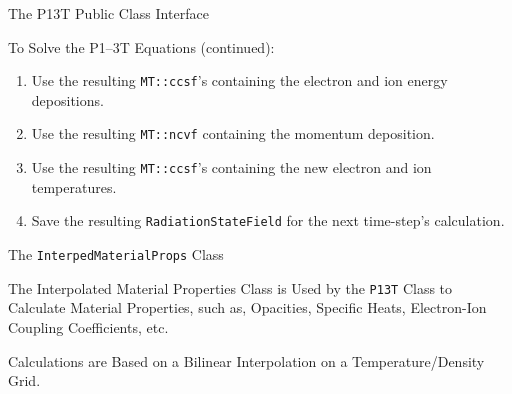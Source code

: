\documentclass{myslidehead}
\begin{document}

\begin{slide}

  \begin{center}
    \large The P13T Public Class Interface
  \end{center}

  To Solve the P1--3T Equations (continued):

  \begin{enumerate}
    \setcounter{enumi}{\value{myenumi}}
    \item Use the resulting \verb#MT::ccsf#'s containing the electron
      and ion energy depositions.
    \item Use the resulting \verb#MT::ncvf# containing the momentum
      deposition.
    \normalcolor
    \item Use the resulting \verb#MT::ccsf#'s containing the new electron
      and ion temperatures.
    \item Save the resulting \verb#RadiationStateField#
      for the next time-step's calculation.
    \setcounter{myenumi}{\value{enumi}}
  \end{enumerate}

\end{slide}


\begin{slide}

  \begin{center}
    \large The \verb#InterpedMaterialProps# Class
  \end{center}

  The Interpolated Material Properties Class is Used by the \verb#P13T# Class
  to Calculate
  Material Properties, such as, Opacities, Specific Heats, Electron-Ion
  Coupling Coefficients, etc.

  Calculations are Based on a Bilinear Interpolation on a Temperature/Density
  Grid.

\end{slide}

\end{document}
